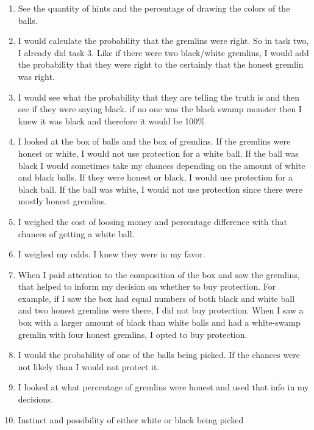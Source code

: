 \documentclass[12pt,a4paper]{article}
\begin{document}
\begin{enumerate}
\item See the quantity of hints and the percentage of drawing the colors of the balls.

\item I would calculate the probability that the gremlins were right. So in task two, I already did task 3. Like if there were two black/white gremlins, I would add the probability that they were right to the certainly that the honest gremlin was right.

\item I would see what the probability that they are telling the truth is and then see if they were saying black. if no one was the black swamp monster then I knew it was black and therefore it would be 100\%

\item I looked at the box of balls and the box of gremlins. If the gremlins were honest or white, I would not use protection for a white ball. If the ball was black I would sometimes take my chances depending on the amount of white and black balls. If they were honest or black, I would use protection for a black ball. If the ball was white, I would not use protection since there were mostly honest gremlins.

\item I weighed the cost of loosing money and percentage difference with that chances of getting a white ball.

\item I weighed my odds. I knew they were in my favor.

\item When I paid attention to the composition of the box and saw the gremlins, that helped to inform my decision on whether to buy protection. For example, if I saw the box had equal numbers of both black and white ball and two honest gremlins were there, I did not buy protection. When I saw a box with a larger amount of black than white balls and had a white-swamp gremlin with four honest gremlins, I opted to buy protection.

\item I would the probability of one of the balls being picked. If the chances were not likely than I would not protect it.

\item I looked at what percentage of gremlins were honest and used that info in my decisions.

\item Instinct and possibility of either white or black being picked


\end{enumerate}
\end{document}
